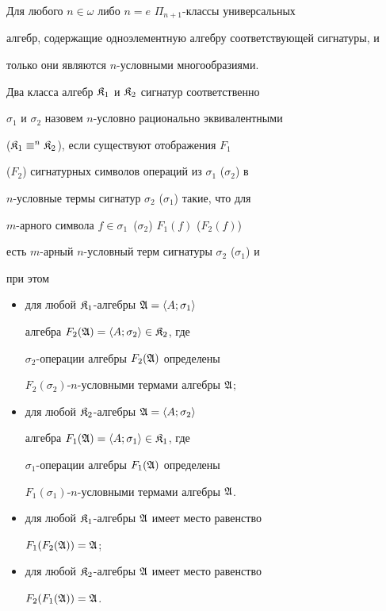 


\begin{cornonum} 


Для любого $n\in\omega$ либо $n=e$\; $\Pi_{n+1}$-классы универсальных 


алгебр, содержащие одноэлементную алгебру соответствующей сигнатуры, и 


только они являются $n$-условными многообразиями. 


\end{cornonum} 


 


\begin{defn} 


Два класса алгебр $\frak K_1$ и $\frak K_2$ сигнатур соответственно 


$\sigma_1$ и $\sigma_2$ назовем $n$-условно рационально эквивалентными 


($\frak K_1\equiv^n\frak K_2$), если существуют отображения $F_1$ 


($F_2$) сигнатурных символов операций из $\sigma_1$ ($\sigma_2$) в 


$n$-условные термы сигнатур $\sigma_2$ ($\sigma_1$) такие, что для 


$m$-арного символа $f\in\sigma_1$~($\sigma_2$)\; $F_1(f)$ ($F_2(f)$) 


есть $m$-арный $n$-условный терм сигнатуры $\sigma_2$ ($\sigma_1$) и 


при этом 


\begin{itemize} 


\item[1)] для любой $\frak K_1$-алгебры $\frak A=\langle A;\sigma_1\rangle$ 


алгебра $F_2(\frak A)=\langle A;\sigma_2\rangle\in\frak K_2$, где 


$\sigma_2$-операции алгебры $F_2(\frak A)$ определены 


$F_2(\sigma_2)$-$n$-условными термами алгебры $\frak A$; 


\item[2)] для любой $\frak K_2$-алгебры $\frak A=\langle A;\sigma_2\rangle$ 


алгебра $F_1(\frak A)=\langle A;\sigma_1\rangle\in\frak K_1$, где 


$\sigma_1$-операции алгебры $F_1(\frak A)$ определены 


$F_1(\sigma_1)$-$n$-условными термами алгебры $\frak A$. 


\item[3)] для любой $\frak K_1$-алгебры $\frak A$ имеет место равенство 


$F_1(F_2(\frak A))=\frak A$; 


\item[4)] для любой $\frak K_2$-алгебры $\frak A$ имеет место равенство 


$F_2(F_1(\frak A))=\frak A$. 


\end{itemize} 


\end{defn} 


